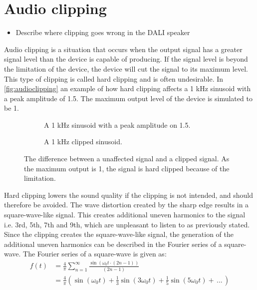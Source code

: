 \section{Audio clipping}

\begin{itemize}
\item Describe where clipping goes wrong in the DALI speaker
\end{itemize}


Audio clipping is a situation that occurs when the output signal has a greater signal level than the device is capable of producing. If the signal level is beyond the limitation of the device, the device will cut the signal to its maximum level. This type of clipping is called hard clipping and is often undesirable. In \autoref{fig:audioclipping} an example of how hard clipping affects a 1 kHz sinusoid with a peak amplitude of 1.5. The maximum output level of the device is simulated to be 1.

\begin{figure}[H]
\centering
\begin{subfigure}[t]{0.47\textwidth}
	
	\caption{A 1 kHz sinusoid with a peak amplitude on 1.5.}
	\label{fig:clippingClean}
\end{subfigure}
\hspace{6mm} 
\begin{subfigure}[t]{0.47\textwidth}
	
	\caption{A 1 kHz clipped sinusoid.}
	\label{fig:clippingDist}
\end{subfigure}
\caption{The difference between a unaffected signal and a clipped signal. As the maximum output is 1, the signal is hard clipped because of the limitation.}
\label{fig:audioclipping}
\end{figure}

Hard clipping lowers the sound quality if the clipping is not intended, and should therefore be avoided. The wave distortion created by the sharp edge results in a square-wave-like signal. This creates additional uneven harmonics to the signal i.e. 3rd, 5th, 7th and 9th, which are unpleasant to listen to as previously stated. Since the clipping creates the square-wave-like signal, the generation of the additional uneven harmonics can be described in the Fourier series of a square-wave. The Fourier series of a square-wave is given as:
\begin{align}\label{eq:fourier_series_square}
f(t) &= \frac{4}{\pi} \sum_{n=1}^{\infty} \frac{\sin (\omega_0 t \cdot (2n-1))}{(2n-1)} \\
	 &= \frac{4}{\pi} (\sin(\omega_0 t) + \frac{1}{3}\sin(3 \omega_0 t) + \frac{1}{5}\sin(5 \omega_0 t) + \, ... \,)
\end{align}
\begin{where}
\\
\end{where}

